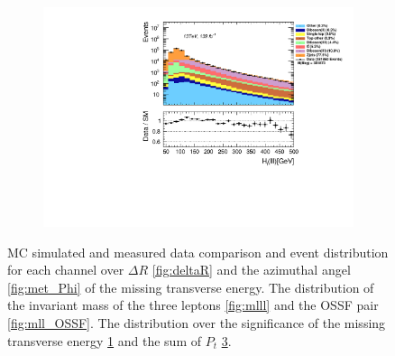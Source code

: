 \begin{figure}[H]
{\begin{subfigure}{.405\textwidth}
        \caption{}
        \label{fig:met_Sign}
    \end{subfigure}
    \hfill
    \begin{subfigure}{.525\textwidth}
        \includegraphics[width=\textwidth]{Figures/FeaturesHistograms/Ht_lll.pdf}
        \caption{}
        \label{fig:Ht_lll}
    \end{subfigure}
    }
    \caption[\acs{MC} simulated and measured data comparison and event distribution for each channel over $\Delta R$ \ref{fig:deltaR}
    and the azimuthal angle of the missing transverse energy. The distribution of the invariant mass of the three leptons and the OSSF pair. 
    The distribution over the significance of the missing transverse energy and the sum of $P_t$.]{\acs{MC} simulated and measured data 
    comparison and event distribution for each channel over $\Delta R$ \ref{fig:deltaR} and the azimuthal
    angel \ref{fig:met_Phi} of the missing transverse energy. The distribution of the invariant mass of the
    three leptons \ref{fig:mlll} and the OSSF pair \ref{fig:mll_OSSF}. The distribution over the significance
    of the missing transverse energy \ref{fig:met_Sign} and the sum of $P_t$ \ref{fig:Ht_lll}.}
\end{figure}
\newpage
